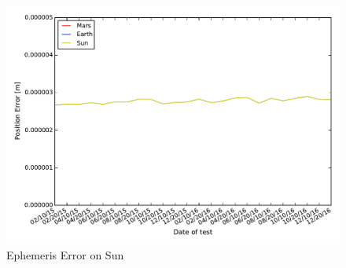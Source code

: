 \begin{figure}[htbp]
\centerline{
\includegraphics[height=0.7\textwidth, keepaspectratio]{AutoTeX/EphemSun}}
\caption{Ephemeris Error on Sun}
\label{fig:EphemSun}
\end{figure}